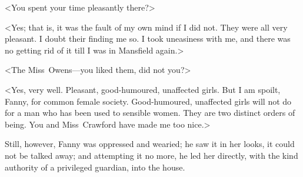 <You spent your time pleasantly there?>

<Yes; that is, it was the fault of my own mind if I did not. They were all very pleasant. I doubt their finding me so. I took uneasiness with me, and there was no getting rid of it till I was in Mansfield again.>

<The Miss~Owens—you liked them, did not you?>

<Yes, very well. Pleasant, good-humoured, unaffected girls. But I am spoilt, Fanny, for common female society. Good-humoured, unaffected girls will not do for a man who has been used to sensible women. They are two distinct orders of being. You and Miss~Crawford have made me too nice.>

Still, however, Fanny was oppressed and wearied; he saw it in her looks, it could not be talked away; and attempting it no more, he led her directly, with the kind authority of a privileged guardian, into the house. 